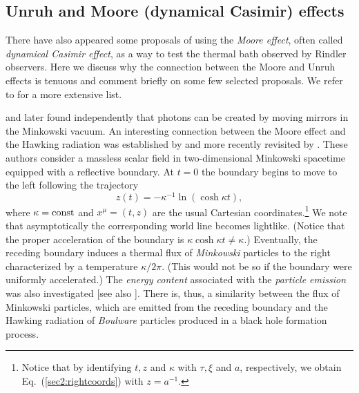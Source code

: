 \documentclass[12pt,nofootinbib,floatfix,aps,prd,showpacs,amsmath,amssymb,eqsecnum]{revtex4-2}
\begin{document}
\subsection{Unruh and Moore (dynamical Casimir) effects}
\label{subsection:dynamicalcasimir}

There have also appeared some proposals of using the {\em Moore effect}, 
often called
{\em dynamical Casimir effect}, as a way to test the thermal 
bath observed by Rindler observers. Here we discuss why the connection 
between the Moore and Unruh effects is tenuous and comment briefly on some 
few selected proposals. We refer to \textcite{Rosu01} for a more 
extensive list.

\textcite{Moore70} and later \textcite{DeWitt75} found independently 
that photons can be created by 
moving mirrors in the Minkowski vacuum. An interesting connection 
between the Moore effect and the Hawking radiation was established 
by \textcite{Daviesetal77} and more recently revisited  by 
\textcite{Calogeracos02b,Calogeracos02}. These authors consider a 
massless scalar field in two-dimensional Minkowski spacetime equipped 
with a reflective boundary. At $t=0$ the boundary begins to move to 
the left following the trajectory
\begin{equation}
z(t) = - \kappa^{-1} \ln (\cosh \kappa t),
\end{equation}
where $\kappa = {\rm const}$ and $x^\mu= (t,z)$ are the usual Cartesian 
coordinates.\footnote{Notice that by identifying $t, z$ and $\kappa$
with $\tau, \xi$ and $a$, respectively, we obtain Eq.~(\ref{sec2:rightcoords})
with $z=a^{-1}$.} We note that asymptotically the corresponding world line 
becomes lightlike. (Notice that the proper acceleration of the boundary
is $\kappa \cosh \kappa t \neq \kappa$.) Eventually, the 
receding boundary induces a thermal flux of {\em Minkowski} particles 
to the right characterized by a temperature $\kappa/2 \pi$. 
(This would not be so if the boundary were uniformly 
accelerated.) The {\em energy content} associated 
with the {\em particle emission} was also investigated  
\cite{Fullingetal76} [see also \textcite{Calogeracos04}]. 
There is,  thus, a similarity between the flux of Minkowski particles, 
which are emitted from the receding boundary and the Hawking 
radiation of {\em Boulware} particles produced in a black hole 
formation process. 
\end{document}
